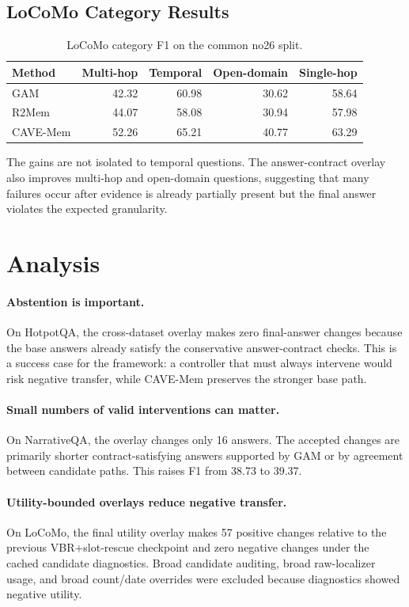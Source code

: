 \documentclass[11pt]{article}
\newcommand{\method}{CAVE-Mem}
\begin{document}
\subsection{LoCoMo Category Results}

\begin{table}[t]
\centering
\small
\begin{tabular}{lrrrr}
\toprule
Method & Multi-hop & Temporal & Open-domain & Single-hop \\
\midrule
GAM & 42.32 & 60.98 & 30.62 & 58.64 \\
R2Mem & 44.07 & 58.08 & 30.94 & 57.98 \\
\method{} & 52.26 & 65.21 & 40.77 & 63.29 \\
\bottomrule
\end{tabular}
\caption{LoCoMo category F1 on the common no26 split.}
\label{tab:locomo_category}
\end{table}

The gains are not isolated to temporal questions. The answer-contract overlay
also improves multi-hop and open-domain questions, suggesting that many
failures occur after evidence is already partially present but the final answer
violates the expected granularity.

\section{Analysis}

\paragraph{Abstention is important.}
On HotpotQA, the cross-dataset overlay makes zero final-answer changes because
the base answers already satisfy the conservative answer-contract checks. This
is a success case for the framework: a controller that must always intervene
would risk negative transfer, while \method{} preserves the stronger base path.

\paragraph{Small numbers of valid interventions can matter.}
On NarrativeQA, the overlay changes only 16 answers. The accepted changes are
primarily shorter contract-satisfying answers supported by GAM or by agreement
between candidate paths. This raises F1 from 38.73 to 39.37.

\paragraph{Utility-bounded overlays reduce negative transfer.}
On LoCoMo, the final utility overlay makes 57 positive changes relative to the
previous VBR+slot-rescue checkpoint and zero negative changes under the cached
candidate diagnostics. Broad candidate auditing, broad raw-localizer usage, and
broad count/date overrides were excluded because diagnostics showed negative
utility.
\end{document}
